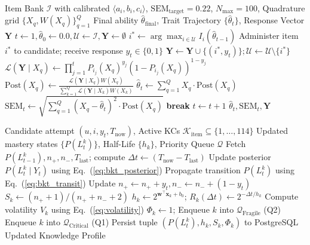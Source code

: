 \documentclass[conference]{IEEEtran}
\begin{document}
\begin{algorithm}[t]
\caption{Real-Time 3PL-IRT Computerized Adaptive Testing}
\label{alg:cat_algorithm}
\begin{algorithmic}[1]
\Require Item Bank $\mathcal{I}$ with calibrated $\langle a_i, b_i, c_i \rangle$, $\text{SEM}_{\text{target}} = 0.22$, $N_{\max} = 100$, Quadrature grid $\{X_q, W(X_q)\}_{q=1}^Q$
\Ensure Final ability $\hat{\theta}_{\text{final}}$, Trait Trajectory $\{\hat{\theta}_t\}$, Response Vector $\mathbf{Y}$
\State $t \gets 1, \hat{\theta}_0 \gets 0.0, \mathcal{U} \gets \mathcal{I}, \mathbf{Y} \gets \emptyset$
    \State $i^* \gets \arg\max_{i \in \mathcal{U}} I_i(\hat{\theta}_{t-1})$ 
    \State Administer item $i^*$ to candidate; receive response $y_t \in \{0, 1\}$
    \State $\mathbf{Y} \gets \mathbf{Y} \cup \{(i^*, y_t)\}; \mathcal{U} \gets \mathcal{U} \setminus \{i^*\}$
        \State $\mathcal{L}(\mathbf{Y} \mid X_q) \gets \prod_{j=1}^t P_{i_j}(X_q)^{y_j} (1 - P_{i_j}(X_q))^{1 - y_j}$
        \State $\text{Post}(X_q) \gets \frac{\mathcal{L}(\mathbf{Y} \mid X_q) W(X_q)}{\sum_{k=1}^Q \mathcal{L}(\mathbf{Y} \mid X_k) W(X_k)}$
    \EndFor
    \State $\hat{\theta}_t \gets \sum_{q=1}^Q X_q \cdot \text{Post}(X_q)$
    \State $\text{SEM}_t \gets \sqrt{\sum_{q=1}^Q (X_q - \hat{\theta}_t)^2 \cdot \text{Post}(X_q)}$
        \State \textbf{break}
    \EndIf
    \State $t \gets t + 1$
\EndWhile
\State \Return $\hat{\theta}_t, \text{SEM}_t, \mathbf{Y}$
\end{algorithmic}
\end{algorithm}

\begin{algorithm}[t]
\caption{Cognitive Digital Twin Update \& Spaced Repetition}
\label{alg:bkt_hlr_algorithm}
\begin{algorithmic}[1]
\Require Candidate attempt $(u, i, y_t, T_{\text{now}})$, Active KCs $\mathcal{K}_{\text{item}} \subseteq \{1, \dots, 114\}$
\Ensure Updated mastery states $\{P(L_t^k)\}$, Half-Life $\{h_k\}$, Priority Queue $\mathcal{Q}$
    \State Fetch $P(L_{t-1}^k), n_+, n_-, T_{\text{last}}$; compute $\Delta t \gets (T_{\text{now}} - T_{\text{last}})$
    \State Update posterior $P(L_t^k \mid Y_t)$ using Eq.~(\ref{eq:bkt_posterior})
    \State Propagate transition $P(L_t^k)$ using Eq.~(\ref{eq:bkt_transit})
    \State Update $n_+ \gets n_+ + y_t, n_- \gets n_- + (1 - y_t)$
    \State $S_k \gets (n_+ + 1) / (n_+ + n_- + 2)$
    \State $h_k \gets 2^{\mathbf{w}^\top \mathbf{x}_k + b_0}$; $R_k(\Delta t) \gets 2^{-\Delta t / h_k}$
    \State Compute volatility $V_k$ using Eq.~(\ref{eq:volatility})
        \State $\Phi_k \gets 1$; Enqueue $k$ into $\mathcal{Q}_{\text{Fragile}}$ (Q2)
        \State Enqueue $k$ into $\mathcal{Q}_{\text{Critical}}$ (Q1)
    \EndIf
    \State Persist tuple $(P(L_t^k), h_k, S_k, \Phi_k)$ to PostgreSQL
\EndFor
\State \Return Updated Knowledge Profile
\end{algorithmic}
\end{algorithm}
\end{document}
